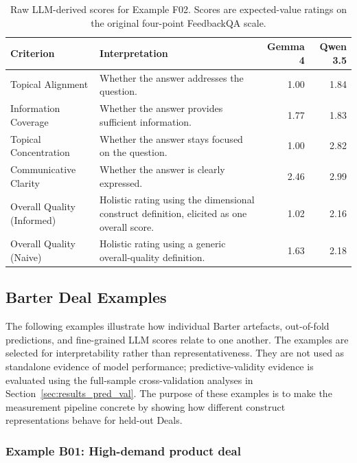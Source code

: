 \begin{table}[h]
\centering
\small
\caption{Raw LLM-derived scores for Example F02. Scores are expected-value ratings on the original four-point FeedbackQA scale.}
\label{tab:feedbackqa_example_f02_scores}
\begin{tabularx}{\textwidth}{@{}l X r r@{}}
\toprule
\textbf{Criterion} & \textbf{Interpretation} & \textbf{Gemma 4} & \textbf{Qwen 3.5} \\
\midrule
Topical Alignment & Whether the answer addresses the question. & 1.00 & 1.84 \\
Information Coverage & Whether the answer provides sufficient information. & 1.77 & 1.83 \\
Topical Concentration & Whether the answer stays focused on the question. & 1.00 & 2.82 \\
Communicative Clarity & Whether the answer is clearly expressed. & 2.46 & 2.99 \\
\addlinespace
Overall Quality (Informed) & Holistic rating using the dimensional construct definition, elicited as one overall score. & 1.02 & 2.16 \\
Overall Quality (Naive) & Holistic rating using a generic overall-quality definition. & 1.63 & 2.18 \\
\bottomrule
\end{tabularx}
\end{table}





\subsection{Barter Deal Examples}\label{app:barter_examples}

The following examples illustrate how individual Barter artefacts, out-of-fold predictions, and fine-grained LLM scores relate to one another. The examples are selected for interpretability rather than representativeness. They are not used as standalone evidence of model performance; predictive-validity evidence is evaluated using the full-sample cross-validation analyses in Section~\ref{sec:results_pred_val}. The purpose of these examples is to make the measurement pipeline concrete by showing how different construct representations behave for held-out Deals.


\subsubsection*{Example B01: High-demand product deal}

